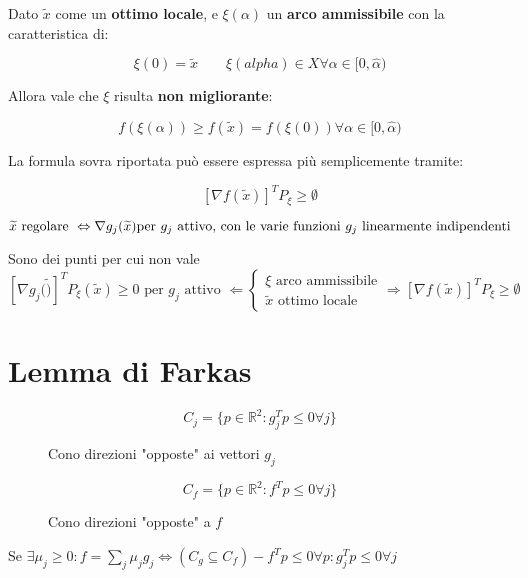 \documentclass[\main/main.tex]{subfiles}
\begin{document}
Dato $\widetilde{x}$ come un \textbf{ottimo locale}, e $\xi(\alpha)$ un \textbf{arco ammissibile} con la caratteristica di:

\[
	\xi(0) = \widetilde{x} \qquad
	\xi(alpha) \in X \forall \alpha \in [0, \widehat{\alpha})
\]

Allora vale che $\xi$ risulta \textbf{non migliorante}:

\[
	f(\xi(\alpha)) \geq f(\widetilde{x}) = f(\xi(0)) \forall \alpha \in [0, \widehat{\alpha})
\]

La formula sovra riportata può essere espressa più semplicemente tramite:

\[
	[\nabla f(\widetilde{x})]^T P_{\xi} \geq \emptyset
\]

\begin{definition}
	\[
		\widetilde{x} \text{ regolare } \Leftrightarrow \nabla g_j (\widetilde{x}) \text{per $ g_j$ attivo, con le varie funzioni $g_j$ linearmente indipendenti}
	\]
\end{definition}

\begin{definition}
	Sono dei punti per cui non vale
	\[
		[\nabla g_j (\widetilde)]^T P_\xi (\widetilde{x}) \geq 0 \text{ per $g_j$ attivo } \Leftarrow 	\begin{cases}
			\xi \text{ arco ammissibile} \\
			\widetilde{x} \text{ ottimo locale}
		\end{cases}
		\Rightarrow
		[\nabla f(\widetilde{x})]^T P_{\xi} \geq \emptyset
	\]
\end{definition}

\section{Lemma di Farkas}

\begin{figure}[H]
	\[
		C_j = \{ p \in \mathbb{R}^2: g_j^T p \leq 0 \forall j \}
	\]
	\caption{Cono direzioni "opposte" ai vettori $g_j$}
\end{figure}

\begin{figure}[H]
	\[
		C_f = \{ p \in \mathbb{R}^2: f^T p \leq 0 \forall j \}
	\]
	\caption{Cono direzioni "opposte" a $f$}
\end{figure}

Se $\exists \mu_j \geq 0 : f = \sum_j \mu_j g_j \Leftrightarrow (C_g \subseteq C_f) -f^Tp \leq 0 \forall p: g_j^Tp \leq 0 \forall j$
\end{document}
